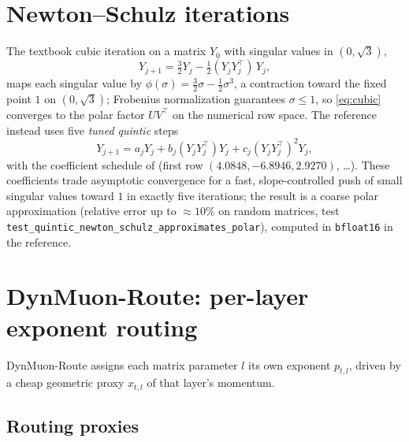 \documentclass{article}
\begin{document}
\section{Newton--Schulz iterations}
\label{sec:ns}

The textbook cubic iteration on a matrix $Y_0$ with singular values in
$(0, \sqrt{3})$,
\begin{equation}
\label{eq:cubic}
Y_{j+1} = \tfrac{3}{2} Y_j - \tfrac{1}{2} (Y_j Y_j^\top)\, Y_j,
\end{equation}
maps each singular value by $\phi(\sigma) = \tfrac32\sigma -
\tfrac12\sigma^3$, a contraction toward the fixed point $1$ on
$(0,\sqrt3)$; Frobenius normalization guarantees $\sigma \le 1$, so
\eqref{eq:cubic} converges to the polar factor $UV^\top$ on the numerical row
space. The reference instead uses five \emph{tuned quintic} steps
\begin{equation}
\label{eq:quintic}
Y_{j+1} = a_j Y_j + b_j (Y_jY_j^\top) Y_j + c_j (Y_jY_j^\top)^2 Y_j,
\end{equation}
with the coefficient schedule of \cite{jordan2024modded} (first row
$(4.0848, -6.8946, 2.9270)$, \dots). These coefficients trade asymptotic
convergence for a fast, slope-controlled push of small singular values toward
$1$ in exactly five iterations; the result is a coarse polar approximation
(relative error up to $\approx 10\%$ on random matrices,
test \texttt{test\_quintic\_newton\_schulz\_approximates\_polar}), computed
in \texttt{bfloat16} in the reference.

\section{DynMuon-Route: per-layer exponent routing}
\label{sec:routing}

DynMuon-Route assigns each matrix parameter $l$ its own exponent $p_{t,l}$,
driven by a cheap geometric proxy $x_{t,l}$ of that layer's momentum.

\subsection{Routing proxies}
\end{document}
